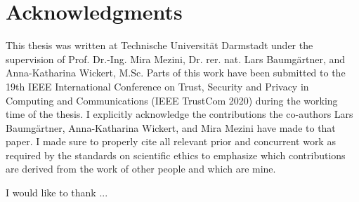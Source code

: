 \chapter*{Acknowledgments}

This thesis was written at Technische Universität Darmstadt under the supervision of Prof. Dr.-Ing. Mira Mezini,
Dr. rer. nat. Lars Baumgärtner, and Anna-Katharina Wickert, M.Sc.
Parts of this work have been submitted to the 19th IEEE International Conference on Trust, Security and Privacy in
Computing and Communications (IEEE TrustCom 2020)  during the working time of the
thesis.
I explicitly acknowledge the contributions the co-authors Lars Baumgärtner, Anna-Katharina Wickert, and Mira Mezini
have made to that paper.
I made sure to properly cite all relevant prior and concurrent work as required by the standards on scientific ethics
to emphasize which contributions are derived from the work of other people and which are mine.

I would like to thank ...
